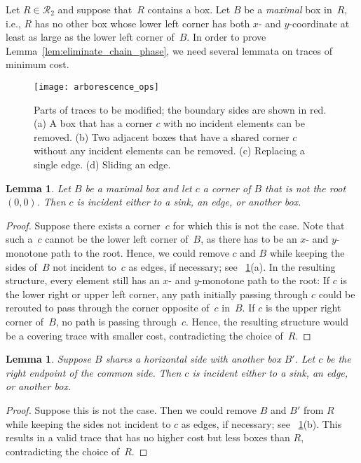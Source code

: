 \documentclass[a4paper,11pt]{article}
\newtheorem{lemma}[theorem]{Lemma}
\newcommand{\qedopt}{}
\begin{document}
Let  $R \in \mathcal{R}_2$ and suppose that~$R$ contains a box.
Let $B$ be a \emph{maximal} box in~$R$, i.e., $R$ has no other box whose lower left corner has 
both $x$- and $y$-coordinate at least as large as the lower left corner of~$B$.
In order to prove Lemma~\ref{lem:eliminate_chain_phase}, we need several lemmata on traces of minimum cost.

\begin{figure}
\begin{center}
\texttt{[image: arborescence\_ops]}
\end{center}
\caption{
Parts of traces to be modified; the boundary sides are shown in red.
(a) A box that has a corner $c$ with no incident elements can be removed.
(b) Two adjacent boxes that have a shared corner $c$ without any incident elements can be removed.
(c) Replacing a single edge.
(d) Sliding an edge.
}
\label{fig:tree_operations}
\end{figure}


\begin{lemma}\label{lem:no_dangling_corner}
Let $B$ be a maximal box and let $c$ a corner of $B$ that is not the root $(0,0)$.
Then $c$ is incident either to a sink, an edge, or another box.
\end{lemma}
\begin{proof}
Suppose there exists a corner~$c$ for which this is not the case.
Note that such a~$c$ cannot be the lower left corner of~$B$, as there has to be an $x$- and $y$-monotone path to the root.
Hence, we could remove $c$ and $B$ while keeping the sides of~$B$ not incident to~$c$ as edges, if necessary;
see \figurename~\ref{fig:tree_operations}(a).
In the resulting structure, every element still has an $x$- and $y$-monotone path to the root:
If $c$ is the lower right or upper left corner, any path initially passing through $c$ could be rerouted to pass through the corner opposite of~$c$ in~$B$.
If $c$ is the upper right corner of~$B$, no path is passing through~$c$.
Hence, the resulting structure would be a covering trace with smaller cost, contradicting the choice of~$R$.
\qedopt
\end{proof}

\begin{lemma}\label{lem:no_double_box}
Suppose $B$ shares a horizontal side with another box $B'$.
Let $c$ be the right endpoint of the common side.
Then $c$ is incident either to a sink, an edge, or another box.
\end{lemma}
\begin{proof}
Suppose this is not the case.
Then we could remove $B$ and $B'$ from $R$ while keeping the sides not incident to $c$ as edges, if necessary; see \figurename~\ref{fig:tree_operations}(b).
This results in a valid trace that has no higher cost but less boxes than $R$, contradicting the choice of~$R$.
\qedopt
\end{proof}
\end{document}

